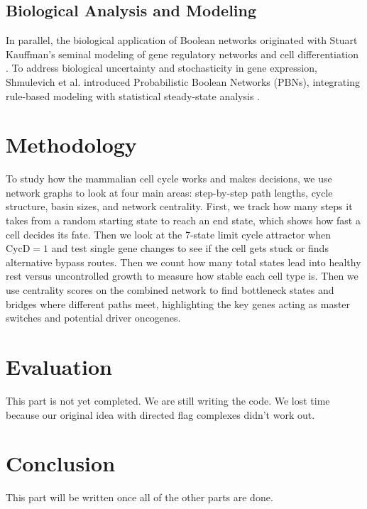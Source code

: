 \documentclass[sigconf]{acmart}
\begin{document}
\subsection*{Biological Analysis and Modeling}
In parallel, the biological application of Boolean networks originated with Stuart Kauffman's seminal modeling of gene regulatory networks and cell differentiation \cite{Kauffman1969}.
To address biological uncertainty and stochasticity in gene expression, Shmulevich et al. introduced Probabilistic Boolean Networks (PBNs), integrating rule-based modeling with statistical steady-state analysis \cite{Shmulevich2002}. 

\section{Methodology}
To study how the mammalian cell cycle works and makes decisions, we use network graphs to look at four main areas: step-by-step path lengths, cycle structure, basin sizes, and network centrality.
First, we track how many steps it takes from a random starting state to reach an end state, which shows how fast a cell decides its fate.
Then we look at the 7-state limit cycle attractor when $\text{CycD} = 1$ and test single gene changes to see if the cell gets stuck or finds alternative bypass routes.
Then we count how many total states lead into healthy rest versus uncontrolled growth to measure how stable each cell type is.
Then we use centrality scores on the combined network to find bottleneck states and bridges where different paths meet, highlighting the key genes acting as master switches and potential driver oncogenes.

\section{Evaluation}
This part is not yet completed.
We are still writing the code.
We lost time because our original idea with directed flag complexes didn't work out.

\section{Conclusion}
This part will be written once all of the other parts are done.


 
\end{document}

